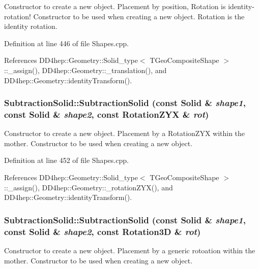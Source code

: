 Constructor to create a new object. Placement by position, Rotation is identity-\/rotation! Constructor to be used when creating a new object. Rotation is the identity rotation. 

Definition at line 446 of file Shapes.cpp.

References DD4hep::Geometry::Solid\_\-type$<$ TGeoCompositeShape $>$::\_\-assign(), DD4hep::Geometry::\_\-translation(), and DD4hep::Geometry::identityTransform().\hypertarget{class_d_d4hep_1_1_geometry_1_1_subtraction_solid_ac9c6a2de374c53eacf01eaa2ee759638}{
\subsubsection[{SubtractionSolid}]{\setlength{\rightskip}{0pt plus 5cm}SubtractionSolid::SubtractionSolid (const {\bf Solid} \& {\em shape1}, \/  const {\bf Solid} \& {\em shape2}, \/  const {\bf RotationZYX} \& {\em rot})}}
\label{class_d_d4hep_1_1_geometry_1_1_subtraction_solid_ac9c6a2de374c53eacf01eaa2ee759638}


Constructor to create a new object. Placement by a RotationZYX within the mother. Constructor to be used when creating a new object. 

Definition at line 452 of file Shapes.cpp.

References DD4hep::Geometry::Solid\_\-type$<$ TGeoCompositeShape $>$::\_\-assign(), DD4hep::Geometry::\_\-rotationZYX(), and DD4hep::Geometry::identityTransform().\hypertarget{class_d_d4hep_1_1_geometry_1_1_subtraction_solid_a9ffb916760e748c1096ab8d765d7884a}{
\subsubsection[{SubtractionSolid}]{\setlength{\rightskip}{0pt plus 5cm}SubtractionSolid::SubtractionSolid (const {\bf Solid} \& {\em shape1}, \/  const {\bf Solid} \& {\em shape2}, \/  const {\bf Rotation3D} \& {\em rot})}}
\label{class_d_d4hep_1_1_geometry_1_1_subtraction_solid_a9ffb916760e748c1096ab8d765d7884a}


Constructor to create a new object. Placement by a generic rotoation within the mother. Constructor to be used when creating a new object. 

